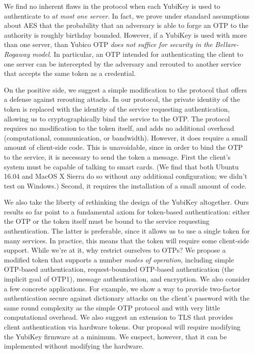 We find no inherent flaws in the protocol when each YubiKey is used to
authenticate to \emph{at most one server}. In fact, we prove under standard
assumptions about AES that the probability that an adversary is able to forge an OTP to
the authority is roughly birthday bounded.
%
However, if a YubiKey is used with more than one server, than Yubico OTP
\emph{does not suffice for security in the Bellare-Rogaway model}.
%
In particular, an OTP intended for authenticating the client to one server can
be intercepted by the adversary and rerouted to another service that accepts the
same token as a credential.

On the positive side, we suggest a simple modification to the protocol that
offers a defense against rerouting attacks. In our protocol, the private
identity of the token is replaced with the identity of the service requesting
authentication, allowing us to cryptographically bind the service to the OTP.
%
The protocol requires no modification to the token itself, and adds no
additional overhead (computational, communication, or bandwidth). However, it
does require a small amount of client-side code. This is unavoidable, since in order to
bind the OTP to the service, it is necessary to send the token a message. First
the client's system must be capable of talking to smart cards. (We find that
both Ubuntu 16.04 and MacOS X Sierra do so without any additional
configuration; we didn't test on Windows.)
%
\fi
%
Second, it requires the installation of a small amount of code.

We also take the liberty of rethinking the design of the YubiKey altogether.
%
Ours results so far point to a fundamental axiom for token-based authentication:
either the OTP or the token itself must be bound to the service requesting
authentication. The latter is preferable, since it allows us to use a single
token for many services.
%
In practice, this means that the token will require some client-side support.
While we're at it, why restrict ourselves to OTPs?
%
We propose a modified token that supports a number \emph{modes of operation},
including simple OTP-based authentication, request-bounded OTP-based
authentication (the implicit goal of OTP1), message authentication, and
encryption.
%
We also consider a few concrete applications. For example, we show a way to provide
two-factor authentication secure against dictionary attacks on the client's
password with the same round complexity as the simple OTP protocol and with very
little computational overhead. We also suggest an extension to TLS that provides
client authentication via hardware tokens.
%
Our proposal will require modifying the YubiKey firmware at a minimum. We
suspect, however, that it can be implemented without modifying the hardware.

